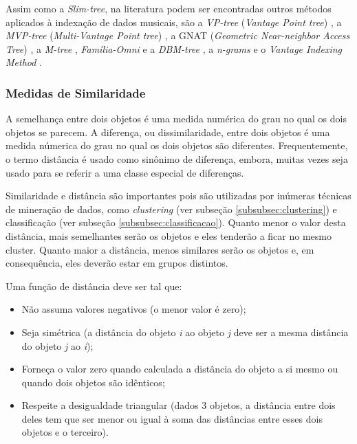 Assim como a \textit{Slim-tree}, na literatura podem ser encontradas outros métodos aplicados à indexação de dados musicais, são a \textit{VP-tree} (\textit{Vantage Point tree}) \cite{yanilos1993}, a \textit{MVP-tree} (\textit{Multi-Vantage Point tree}) \cite{bozkaya1997}, a GNAT (\textit{Geometric Near-neighbor Access Tree}) \cite{brin1995}, a \textit{M-tree} \cite{ciaccia1997}, \textit{Família-Omni} e a \textit{DBM-tree} \cite{filho2001, vieira2004}, a \textit{n-grams} \cite{downie1999} e o \textit{Vantage Indexing Method} \cite{typke2003}.

\subsubsection{Medidas de Similaridade} \label{subsubsec:medidas-similaridade}
A semelhança entre dois objetos é uma medida numérica do grau no qual os dois objetos se parecem. A diferença, ou dissimilaridade, entre dois objetos é uma medida númerica do grau no qual os dois objetos são diferentes. Frequentemente, o termo distância é usado como sinônimo de diferença, embora, muitas vezes seja usado para se referir a uma classe especial de diferenças.

Similaridade e distância são importantes pois são utilizadas por inúmeras técnicas de mineração de dados, como \textit{clustering} (ver subseção \ref{subsubsec:clustering}) e classificação (ver subseção \ref{subsubsec:classificacao}). Quanto menor o valor desta distância, mais semelhantes serão os objetos e eles tenderão a ficar no mesmo cluster. Quanto maior a distância, menos similares serão os objetos e, em consequência, eles deverão estar em grupos distintos.

Uma função de distância deve ser tal que:
\begin{itemize}
    \item Não assuma valores negativos (o menor valor é zero);
    \item Seja simétrica (a distância do objeto \textit{i} ao objeto \textit{j} deve ser a mesma distância do objeto \textit{j} ao \textit{i});
    \item Forneça o valor zero quando calculada a distância do objeto a si mesmo ou quando dois objetos são idênticos;
    \item Respeite a desigualdade triangular (dados 3 objetos, a distância entre dois deles tem que ser menor ou igual à soma das distâncias entre esses dois objetos e o terceiro).
\end{itemize}

